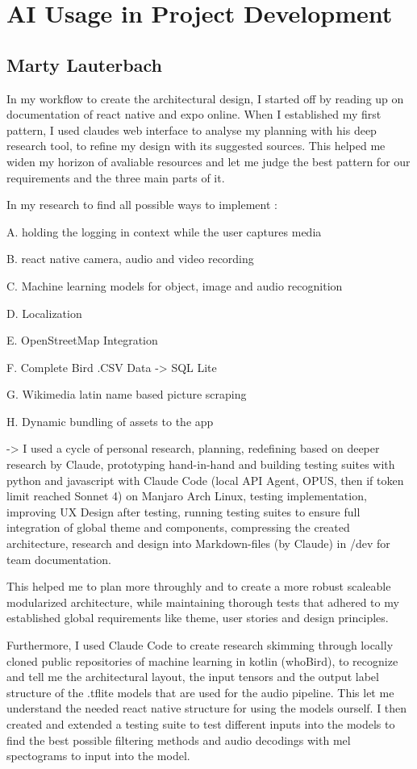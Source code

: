 \section{AI Usage in Project Development}

\subsection{Marty Lauterbach}

In my workflow to create the architectural design, I started off by reading up on documentation of react native and expo online.
When I established my first pattern, I used claudes web interface to analyse my planning with his deep research tool, to refine my design with its suggested sources.
This helped me widen my horizon of avaliable resources and let me judge the best pattern for our requirements and the three main parts of it.

In my research to find all possible ways to implement :

A. holding the logging in context while the user captures media

B. react native camera, audio and video recording

C. Machine learning models for object, image and audio recognition

D. Localization

E. OpenStreetMap Integration

F. Complete Bird .CSV Data -> SQL Lite

G. Wikimedia latin name based picture scraping

H. Dynamic bundling of assets to the app

-> I used a cycle of personal research, planning, redefining based on deeper research by Claude, prototyping hand-in-hand and building testing suites with python and javascript with Claude Code (local API Agent, OPUS, then if token limit reached Sonnet 4) on Manjaro Arch Linux, testing implementation, improving UX Design after testing, running testing suites to ensure full integration of global theme and components, compressing the created architecture, research and design into Markdown-files (by Claude) in /dev for team documentation.

This helped me to plan more throughly and to create a more robust scaleable modularized architecture, while maintaining thorough tests that adhered to my established global requirements like theme, user stories and design principles.

Furthermore, I used Claude Code to create research skimming through locally cloned public repositories of machine learning in kotlin (whoBird), to recognize and tell me the architectural layout, the input tensors and the output label structure of the .tflite models that are used for the audio pipeline. This let me understand the needed react native structure for using the models ourself.
I then created and extended a testing suite to test different inputs into the models to find the best possible filtering methods and audio decodings with mel spectograms to input into the model.

